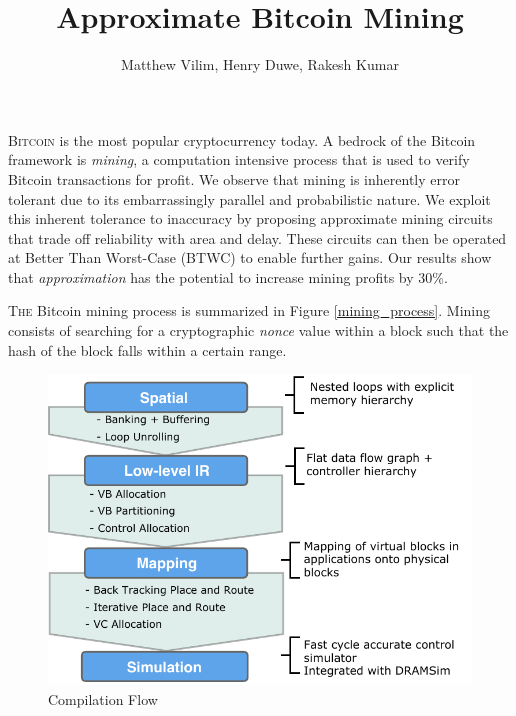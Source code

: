 \documentclass[portrait,a0,final]{a0poster}
\begin{document}
\setlength{\columnsep}{50pt}

\title{\veryHuge Approximate Bitcoin Mining}
\author{\Large Matthew Vilim, Henry Duwe, Rakesh Kumar}
\date{}
\maketitle

\begin{multicols}{3}

\begin{tcolorbox}[title=Abstract]
\lettrine{B}{itcoin} is the most popular cryptocurrency today. A bedrock of the Bitcoin framework is \emph{mining}, a computation intensive process that is used to verify Bitcoin transactions for profit. We observe that mining is inherently error tolerant due to its embarrassingly parallel and probabilistic nature. We exploit this inherent tolerance to inaccuracy by proposing approximate mining circuits that trade off reliability with area and delay. These circuits can then be operated at Better Than Worst-Case (BTWC) to enable further gains. Our results show that \emph{approximation} has the potential to increase mining profits by 30\%.
\end{tcolorbox}

\begin{tcolorbox}[title=Mining Background]
\lettrine{T}{he} Bitcoin mining process is summarized in Figure \ref{mining_process}. Mining consists of searching for a cryptographic \emph{nonce} value within a block such that the hash of the block falls within a certain range.
\end{tcolorbox}

\begin{figure}[H]
\caption{Compilation Flow}
\label{fig:flow}
\centering
\includegraphics[width=1\linewidth]{figs/flow.pdf}
\end{figure}


\end{multicols}
\end{document}
